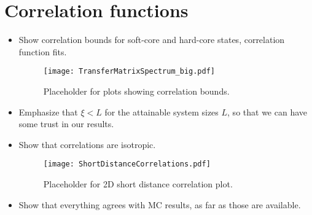 
\section{Correlation functions}

\begin{itemize}
\item Show correlation bounds for soft-core and hard-core states, correlation function fits.

\begin{figure}[H]
	\centering
	\texttt{[image: TransferMatrixSpectrum\_big.pdf]}
	\caption{Placeholder for plots showing correlation bounds.}
	\label{fig:TMS}
\end{figure}

\item Emphasize that $\xi < L$ for the attainable system sizes $L$, so that we can have some trust in our results.
\item Show that correlations are isotropic.

\begin{figure}[H]
	\centering
	\texttt{[image: ShortDistanceCorrelations.pdf]}
	\caption{Placeholder for 2D short distance correlation plot.}
	\label{fig:ShortCorr}
\end{figure}

\item Show that everything agrees with MC results, as far as those are available.
\end{itemize}


